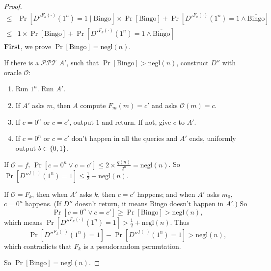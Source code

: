 \documentclass[12pt]{article}
\newcommand{\negl}{\text{negl}}
\newcommand{\Bingo}{\text{Bingo}}
\newcommand{\OO}{\mathcal{O}}
\newenvironment{problem}[2][Problem]{\begin{trivlist}
\item[\hskip \labelsep {\bfseries #1}\hskip \labelsep {\bfseries #2.}]}{\end{trivlist}}
\begin{document}
\begin{problem}{10}
\begin{proof}
\begin{align*}
    \le &\Pr[{D'}^{F_k(\cdot)}(1^n)=1\mid\Bingo]\times \Pr[\Bingo]+\Pr[{D'}^{F_k(\cdot)}(1^n)=1\land\overline{\Bingo}]\\
    \le&1\times \Pr[\Bingo]+\Pr[{D'}^{F_k(\cdot)}(1^n)=1\land\overline{\Bingo}]
\end{align*}
\textbf{First}, we prove $\Pr[\Bingo]=\negl(n)$.\par
If there is a $\mathcal{PPT}$ $A'$, such that $\Pr[\Bingo]>\negl(n)$, construct $D''$ with oracle $\OO$:
\begin{enumerate}
    \item Run $1^n$. Run $A'$.
    \item If $A'$ asks $m$, then $A$ compute $F_m(m)=c'$ and asks $\OO(m)=c$.
    \item If $c=0^n$ or $c=c'$, output $1$ and return. If not, give $c$ to $A'$.
    \item If $c=0^n$ or $c=c'$ don't happen in all the queries and $A'$ ends, uniformly output $b\in\{0,1\}$.
\end{enumerate}\par
If $\OO=f$, $\Pr[c=0^{n}\lor c=c']\le 2\times\frac{q(n)}{2^n}=\negl(n)$. So $\Pr[D''^{f(\cdot)}(1^n)=1]\le\frac12+\negl(n)$.\par
If $\OO=F_k$, then when $A'$ asks $k$, then $c=c'$ happens; and when $A'$ asks $m_0$, $c=0^{n}$ happens. (If $D''$ doesn't return, it means $\Bingo$ doesn't happen in $A'$.) So $$\Pr[c=0^{n}\lor c=c']\ge\Pr[\Bingo]>\negl(n),$$which means $\Pr[D''^{F_k(\cdot)}(1^n)=1]>\frac12+\negl(n)$.
Thus\[\Pr[D''^{F_k(\cdot)}(1^n)=1]-\Pr[D''^{f(\cdot)}(1^n)=1]>\negl(n),\]
which contradicts that $F_k$ is a pseudorandom permutation.\par
So $\Pr[\Bingo]=\negl(n)$.\par\vspace{4ex}


\end{proof}
\end{problem}
\end{document}
